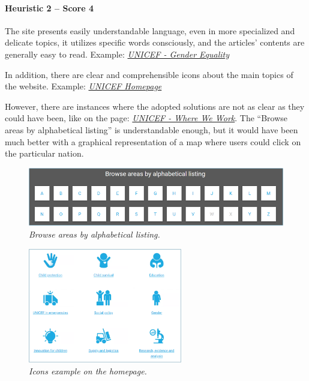 \paragraph*{Heuristic 2 – Score 4}
The site presents easily understandable language, even in more specialized and delicate topics, it utilizes specific words consciously, and the articles' contents are generally easy to read.
Example: \textit{\href{https://www.unicef.org/gender-equality}{UNICEF - Gender Equality}}

In addition, there are clear and comprehensible icons about the main topics of the website.
Example: \textit{\href{https://www.unicef.org/}{UNICEF Homepage}}

However, there are instances where the adopted solutions are not as clear as they could have been, like on the page: \textit{\href{https://www.unicef.org/where-we-work}{UNICEF - Where We Work}}. The “Browse areas by alphabetical listing” is understandable enough, but it would have been much better with a graphical representation of a map where users could click on the particular nation.
\begin{figure}[h]
	\includegraphics[width=\textwidth]{Picture3.png}
	\captionsetup{font=small}
	\caption{\textit{Browse areas by alphabetical listing.}}
	\label{fig:label2}
\end{figure}
\begin{figure}[h]
	\centering
	\begin{center}
		\includegraphics[width=0.6\textwidth]{Picture2.png}
	\end{center}
	\captionsetup{font=small}
	\caption{\textit{Icons example on the homepage.}}
	\label{fig:label3}
\end{figure}


